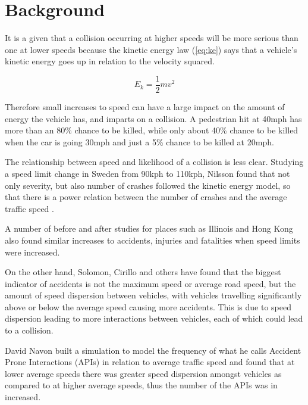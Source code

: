 \documentclass[10pt,journal,compsoc]{IEEEtran}
\begin{document}

\section{Background}

It is a given that a collision occurring at higher speeds will be more serious than one at lower speeds because the kinetic energy law (\ref{eq:ke}) says that a vehicle's kinetic energy goes up in relation to the velocity squared. 

\begin{equation}
\label{eq:ke}
E_{k} = \frac{1}{2} mv^2
\end{equation}

Therefore small increases to speed can have a large impact on the amount of energy the vehicle has, and imparts on a collision.  A pedestrian hit at 40mph has more than an 80\% chance to be killed, while only about 40\% chance to be killed when the car is going 30mph and just a 5\% chance to be killed at 20mph\cite{fatalityrates}.

The relationship between speed and likelihood of a collision is less clear. Studying a speed limit change in Sweden from 90kph to 110kph, Nilsson found that not only severity, but also number of crashes followed the kinetic energy model, so that there is a power relation between the number of crashes and the average traffic speed \cite{aarts2006driving}.  

A number of before and after studies for places such as Illinois\cite{rock1995impact} and Hong Kong\cite{wong2005would} also found similar increases to accidents, injuries and fatalities when speed limits were increased.

On the other hand, Solomon, Cirillo and others have found that the biggest indicator of accidents is not the maximum speed or average road speed, but the amount of speed dispersion between vehicles, with vehicles travelling significantly above or below the average speed causing more accidents\cite{aarts2006driving}.  This is due to speed dispersion leading to more interactions between vehicles, each of which could lead to a collision.  

David Navon built a simulation to model the frequency of what he calls Accident Prone Interactions (APIs)  in relation to average traffic speed and found that at lower average speeds there was greater speed dispersion amongst vehicles as compared to at higher average speeds, thus the number of the APIs was in increased\cite{navon2003paradox}.  
\end{document}
